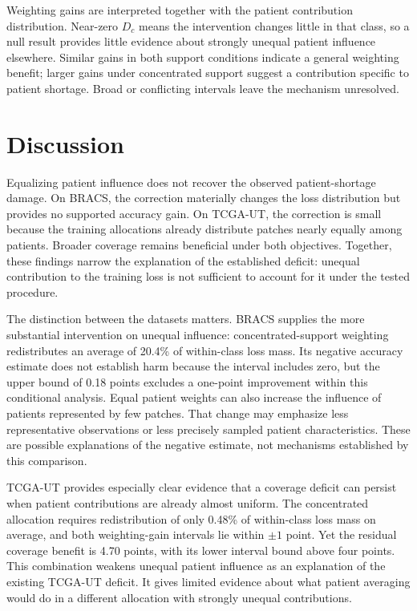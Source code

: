 \documentclass[11pt]{article}
\begin{document}
Weighting gains are interpreted together with the patient contribution distribution. Near-zero \(D_c\) means the intervention changes little in that class, so a null result provides little evidence about strongly unequal patient influence elsewhere. Similar gains in both support conditions indicate a general weighting benefit; larger gains under concentrated support suggest a contribution specific to patient shortage. Broad or conflicting intervals leave the mechanism unresolved.



\section{Discussion}
\label{sec:discussion}
Equalizing patient influence does not recover the observed patient-shortage damage. On BRACS, the correction materially changes the loss distribution but provides no supported accuracy gain. On TCGA-UT, the correction is small because the training allocations already distribute patches nearly equally among patients. Broader coverage remains beneficial under both objectives. Together, these findings narrow the explanation of the established deficit: unequal contribution to the training loss is not sufficient to account for it under the tested procedure.

The distinction between the datasets matters. BRACS supplies the more substantial intervention on unequal influence: concentrated-support weighting redistributes an average of 20.4\% of within-class loss mass. Its negative accuracy estimate does not establish harm because the interval includes zero, but the upper bound of 0.18 points excludes a one-point improvement within this conditional analysis. Equal patient weights can also increase the influence of patients represented by few patches. That change may emphasize less representative observations or less precisely sampled patient characteristics. These are possible explanations of the negative estimate, not mechanisms established by this comparison.

TCGA-UT provides especially clear evidence that a coverage deficit can persist when patient contributions are already almost uniform. The concentrated allocation requires redistribution of only 0.48\% of within-class loss mass on average, and both weighting-gain intervals lie within $\pm1$ point. Yet the residual coverage benefit is 4.70 points, with its lower interval bound above four points. This combination weakens unequal patient influence as an explanation of the existing TCGA-UT deficit. It gives limited evidence about what patient averaging would do in a different allocation with strongly unequal contributions.
\end{document}
